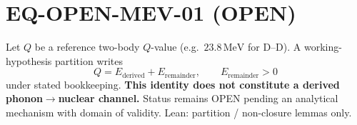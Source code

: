 \documentclass{article}
\begin{document}
\section*{EQ-OPEN-MEV-01 (OPEN)}
Let $Q$ be a reference two-body $Q$-value (e.g.\ $23.8\,\mathrm{MeV}$ for D--D).
A working-hypothesis partition writes
\[
  Q = E_{\mathrm{derived}} + E_{\mathrm{remainder}},
  \qquad E_{\mathrm{remainder}} > 0
\]
under stated bookkeeping. \textbf{This identity does not constitute a derived
phonon$\to$nuclear channel.} Status remains OPEN pending an analytical mechanism
with domain of validity. Lean: partition / non-closure lemmas only.
\end{document}
